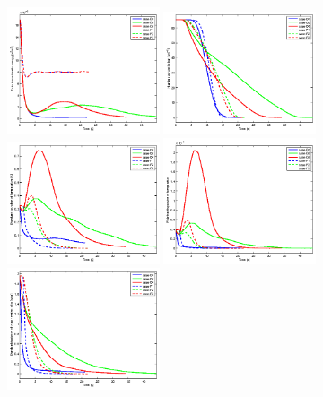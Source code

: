 \begin{figure}[!htbp]\centering 
\includegraphics[width=0.4\textwidth]{Figures/tke}
\includegraphics[width=0.4\textwidth]{Figures/num_con}\\
\includegraphics[width=0.4\textwidth]{Figures/temp_std}
\includegraphics[width=0.4\textwidth]{Figures/temp_dsp}\\
\includegraphics[width=0.4\textwidth]{Figures/vapor_std}

\end{figure}
